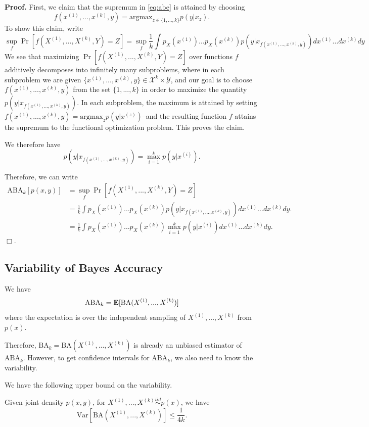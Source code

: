 \documentclass[12pt]{article}
\begin{document}
\noindent\textbf{Proof.}
First, we claim that the supremum in \eqref{eq:abe} is attained by choosing
\[
f(x^{(1)},...,x^{(k)}, y) = \text{argmax}_{z \in \{1,...,k\}} p(y|x_z).
\]
To show this claim, write
\[
\sup_f \Pr[f(X^{(1)},...,X^{(k)}, Y) = Z] = \sup_f \frac{1}{k}\int p_X(x^{(1)})\hdots p_X(x^{(k)}) p(y|x_{f(x^{(1)},...,x^{(k)}, y)}) dx^{(1)}\hdots dx^{(k)} dy
\]
We see that maximizing $\Pr[f(X^{(1)},...,X^{(k)}, Y) = Z]$ over functions $f$
additively decomposes into infinitely many subproblems, where in each
subproblem we are given $\{x^{(1)},...,x^{(k)},
y\} \in \mathcal{X}^k \times \mathcal{Y}$, and our goal is to choose
$f(x^{(1)},...,x^{(k)}, y)$ from the set $\{1,...,k\}$ in order to maximize
the quantity $p(y|x_{f(x^{(1)},...,x^{(k)}, y)})$.  In each subproblem,
the maximum is attained by setting $f(x^{(1)},...,x^{(k)},y) = \text{argmax}_z
p(y|x^{(z)})$--and the resulting function $f$ attains the supremum to the
functional optimization problem.  This proves the claim.

We therefore have
\[
p(y|x_{f(x^{(1)},...,x^{(k)}, y)}) = \max_{i=1}^k p(y|x^{(i)}).
\]

Therefore, we can write
\begin{align*}
\text{ABA}_k[p(x, y)] &= \sup_f \Pr[f(X^{(1)},...,X^{(k)}, Y) = Z]
\\&=  \frac{1}{k} \int p_X(x^{(1)})\hdots p_X(x^{(k)}) p(y|x_{f(x^{(1)},...,x^{(k)}, y)})  dx^{(1)}\hdots dx^{(k)} dy.
\\&=  \frac{1}{k} \int p_X(x^{(1)})\hdots p_X(x^{(k)}) \max_{i=1}^k p(y|x^{(i)})  dx^{(1)}\hdots dx^{(k)} dy.
\end{align*}
$\Box$.

\subsection{Variability of Bayes Accuracy}
We have
\[
\text{ABA}_k = \textbf{E}[\text{BA}(X^{(1)},...,X^{(k)})]
\]
where the expectation is over the independent sampling of $X^{(1)},...,X^{(k)}$ from $p(x)$.

Therefore, $\text{BA}_k = \text{BA}(X^{(1)},...,X^{(k)})$ is already an
unbiased estimator of $\text{ABA}_k$.  However, to get confidence
intervals for $\text{ABA}_k$, we also need to know the variability.

We have the following upper bound on the variability.

\begin{theorem}
Given joint density $p(x, y)$, for $X^{(1)},...,X^{(k)} \stackrel{iid}{\sim} p(x)$, we have
\[
\text{Var}[\text{BA}(X^{(1)},...,X^{(k)})] \leq \frac{1}{4k}.
\]
\end{theorem}
\end{document}
